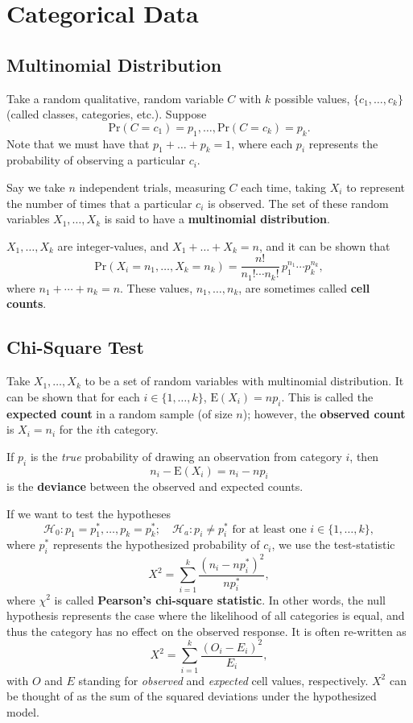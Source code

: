 \documentclass[12pt]{article}
\begin{document}
\section{Categorical Data}
\subsection{Multinomial Distribution}

Take a random qualitative, random variable $C$ with $k$ possible values, $\{c_1, \dots, c_k \}$ (called classes, categories, etc.). Suppose \[\text{Pr}(C = c_1) = p_1, \dots, \text{Pr}(C = c_k) = p_k.\] Note that we must have that $p_1 + \dots + p_k = 1$, where each $p_i$ represents the probability of observing a particular $c_i$.

Say we take $n$ independent trials, measuring $C$ each time, taking $X_i$ to represent the number of times that a particular $c_i$ is observed. The set of these random variables $X_1, \dots, X_k$ is said to have a \textbf{multinomial distribution}. 

$X_1, \dots, X_k$ are integer-values, and $X_1 + \dots + X_k = n$, and it can be shown that \[\text{Pr}(X_i = n_1, \dots, X_k = n_k) = \frac{n!}{n_1! \cdots n_k!}\,p_1^{n_1}\cdots p_k^{n_k},\] where $n_1 + \cdots + n_k = n$. These values, $n_1, \dots, n_k$, are sometimes called \textbf{cell counts}.

\subsection{Chi-Square Test}

Take $X_1, \dots, X_k$ to be a set of random variables with multinomial distribution. It can be shown that for each $i \in \{1, \dots, k\}$, $\text{E}(X_i) = n p_i$. This is called the \textbf{expected count} in a random sample (of size $n$); however, the \textbf{observed count} is $X_i = n_i$ for the $i$th category.

If $p_i$ is the \textit{true} probability of drawing an observation from category $i$, then \[n_i-\text{E}(X_i) = n_i - n p_i\] is the \textbf{deviance} between the observed and expected counts.

If we want to test the hypotheses \[\mathcal{H}_0: p_1 = p_1^*, \dots, p_k = p_k^*; \quad \mathcal{H}_a: p_i \neq p_i^* \text{ for at least one } i \in \{1, \dots, k\},\] where $p_i^*$ represents the hypothesized probability of $c_i$, we use the test-statistic \[X^2 = \sum_{i = 1}^k \frac{(n_i - n p_i^*)^2}{np_i^*},\] where $\chi^2$ is called \textbf{Pearson's chi-square statistic}. In other words, the null hypothesis represents the case where the likelihood of all categories is equal, and thus the category has no effect on the observed response. It is often re-written as \[X^2 = \sum_{i=1}^k \frac{(O_i - E_i)^2}{E_i},\] with $O$ and $E$ standing for \textit{observed} and \textit{expected} cell values, respectively. $X^2$ can be thought of as the sum of the squared deviations under the hypothesized model.
\end{document}
